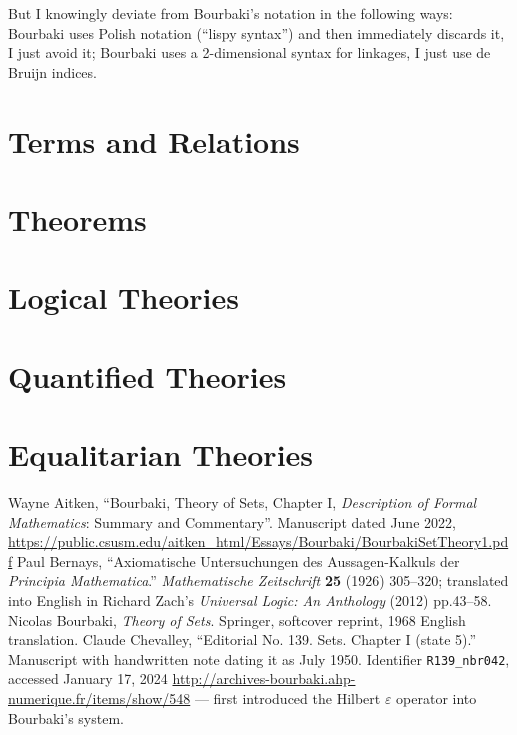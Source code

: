 \documentclass{amsart}
\begin{document}
But I knowingly deviate from Bourbaki's notation in the following ways:
Bourbaki uses Polish notation (``lispy syntax'') and then immediately
discards it, I just avoid it; Bourbaki uses a 2-dimensional syntax for
linkages, I just use de Bruijn indices.

\section{Terms and Relations}






\section{Theorems}





\section{Logical Theories}






\section{Quantified Theories}




\section{Equalitarian Theories}


\begin{thebibliography}{99}
 Wayne Aitken,
  ``Bourbaki, Theory of Sets, Chapter I, \textit{Description of Formal Mathematics}: Summary and Commentary''.
  Manuscript dated June 2022,
  \url{https://public.csusm.edu/aitken_html/Essays/Bourbaki/BourbakiSetTheory1.pdf}
 Paul Bernays, ``Axiomatische Untersuchungen des
Aussagen-Kalkuls der \textit{Principia Mathematica}.''
\textit{Mathematische Zeitschrift} \textbf{25} (1926) 305--320;
translated into English in Richard Zach's \textit{Universal Logic: An
  Anthology} (2012) pp.43--58.
 Nicolas Bourbaki,
  \textit{Theory of Sets}.
  Springer, softcover reprint, 1968 English translation.
Claude Chevalley, ``Editorial No. 139. Sets. Chapter I (state 5).''
Manuscript with handwritten note dating it as July 1950.
Identifier \verb#R139_nbr042#, accessed January 17, 2024 \url{http://archives-bourbaki.ahp-numerique.fr/items/show/548}
--- first introduced the Hilbert $\varepsilon$ operator into Bourbaki's system.
\end{thebibliography}
\end{document}
